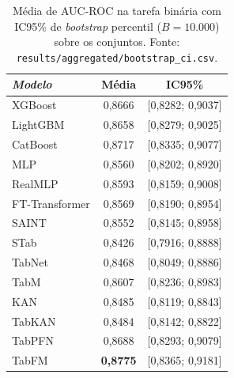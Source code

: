 \begin{table}[htbp]
\centering
\small
\caption[IC bootstrap da média de AUC --- binária]{Média de AUC-ROC na tarefa binária com IC95\% de \emph{bootstrap} percentil ($B{=}10.000$) sobre os conjuntos. Fonte: \texttt{results/\allowbreak aggregated/\allowbreak bootstrap\_\allowbreak ci.\allowbreak csv}.}
\label{tab:app-bootstrap-auc}
\begin{tabular}{lcc}
\toprule
\emph{Modelo} & Média & IC95\% \\
\midrule
XGBoost & 0{,}8666 & [0{,}8282; 0{,}9037] \\
LightGBM & 0{,}8658 & [0{,}8279; 0{,}9025] \\
CatBoost & 0{,}8717 & [0{,}8335; 0{,}9077] \\
MLP & 0{,}8560 & [0{,}8202; 0{,}8920] \\
RealMLP & 0{,}8593 & [0{,}8159; 0{,}9008] \\
FT-Transformer & 0{,}8569 & [0{,}8190; 0{,}8954] \\
SAINT & 0{,}8552 & [0{,}8145; 0{,}8958] \\
STab & 0{,}8426 & [0{,}7916; 0{,}8888] \\
TabNet & 0{,}8468 & [0{,}8049; 0{,}8886] \\
TabM & 0{,}8607 & [0{,}8236; 0{,}8983] \\
KAN & 0{,}8485 & [0{,}8119; 0{,}8843] \\
TabKAN & 0{,}8484 & [0{,}8142; 0{,}8822] \\
TabPFN & 0{,}8688 & [0{,}8293; 0{,}9079] \\
TabFM & \textbf{0{,}8775} & [0{,}8365; 0{,}9181] \\
\bottomrule
\end{tabular}
\end{table}

